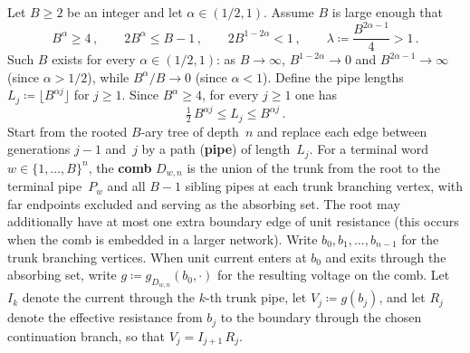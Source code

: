\documentclass[11pt]{amsart}
\theoremstyle{plain}
\theoremstyle{definition}
\begin{document}
	Let $B\geq 2$ be an integer and let $\alpha\in(1/2,1)$.  Assume $B$ is large enough that
	\begin{equation}\label{eq:comb-B-cond}
		B^{\alpha}\geq 4\,,
		\qquad
		2B^{\alpha}\leq B-1\,,
		\qquad
		2B^{1-2\alpha}<1\,,
		\qquad
		\lambda\coloneqq\frac{B^{2\alpha-1}}{4}>1\,.
	\end{equation}
	Such $B$ exists for every $\alpha\in(1/2,1)$: as $B\to\infty$, $B^{1-2\alpha}\to 0$ and $B^{2\alpha-1}\to\infty$ (since $\alpha>1/2$), while $B^{\alpha}/B\to 0$ (since $\alpha<1$).  Define the pipe lengths $L_j\coloneqq\lfloor B^{\alpha j}\rfloor$ for $j\geq 1$. Since $B^{\alpha}\geq 4$, for every $j\geq 1$ one has
	\begin{equation}\label{eq:comb-Lj-bounds}
		\tfrac{1}{2}\,B^{\alpha j}
		\leq L_j
		\leq B^{\alpha j}\,.
	\end{equation}
	Start from the rooted $B$-ary tree of depth~$n$ and replace each edge between generations $j{-}1$ and~$j$ by a path (\textbf{pipe}) of length~$L_j$.  For a terminal word $w\in\{1,\ldots,B\}^n$, the \textbf{comb} $D_{w,n}$ is the union of the trunk from the root to the terminal pipe~$P_w$ and all $B{-}1$ sibling pipes at each trunk branching vertex, with far endpoints excluded and serving as the absorbing set.  The root may additionally have at most one extra boundary edge of unit resistance (this occurs when the comb is embedded in a larger network).
	Write $b_0,b_1,\ldots,b_{n-1}$ for the trunk branching vertices.  When unit current enters at $b_0$ and exits through the absorbing set, write $g\coloneqq g_{D_{w,n}}(b_0,\cdot)$ for the resulting voltage on the comb.  Let $I_k$ denote the current through the $k$-th trunk pipe, let $V_j\coloneqq g(b_j)$, and let $R_j$ denote the effective resistance from $b_j$ to the boundary through the chosen continuation branch, so that $V_j=I_{j+1}\,R_j$.
	
\end{document}
